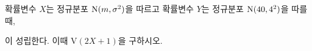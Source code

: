 확률변수 $X$는 정규분포 $\mathrm{N}(m{,}\mkern3mu\mathopen{}\sigma^2)$을 따르고 확률변수 $Y$는 정규분포 $\mathrm{N}(40{,}\mkern3mu\mathopen{}4^2)$을 따를 때, \par\smallskip{}\par\smallskip\noindent 이 성립한다. 이때 $\mathrm{V}(2X+1)$을 구하시오.
